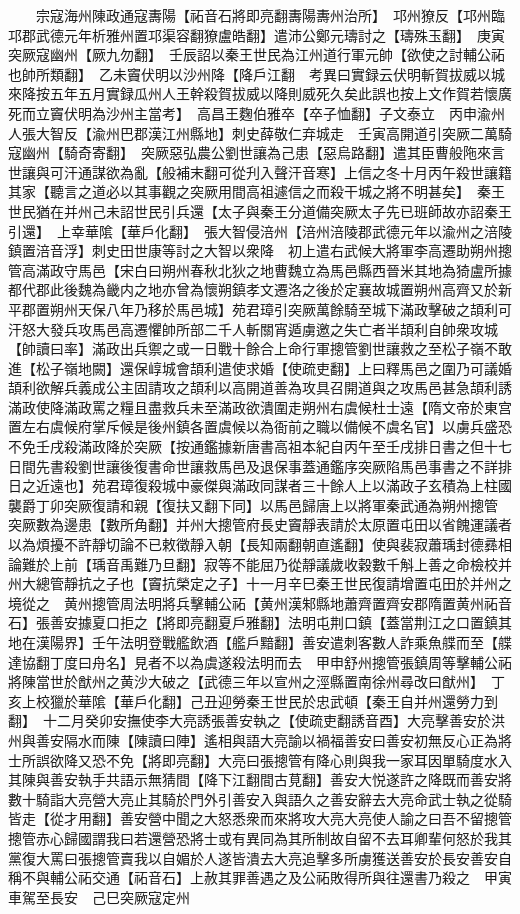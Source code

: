 　　宗寇海州陳政通寇夀陽【祏音石將即亮翻夀陽夀州治所】　邛州獠反【邛州臨邛郡武德元年析雅州置邛渠容翻獠盧皓翻】遣沛公鄭元璹討之【璹殊玉翻】　庚寅突厥寇幽州【厥九勿翻】　壬辰詔以秦王世民為江州道行軍元帥【欲使之討輔公祏也帥所類翻】　乙未竇伏明以沙州降【降戶江翻　考異曰實録云伏明斬賀拔威以城來降按五年五月實録瓜州人王幹殺賀拔威以降則威死久矣此誤也按上文作賀若懷廣死而立竇伏明為沙州主當考】　高昌王麴伯雅卒【卒子恤翻】子文泰立　丙申渝州人張大智反【渝州巴郡漢江州縣地】刺史薛敬仁弃城走　壬寅高開道引突厥二萬騎寇幽州【騎奇寄翻】　突厥惡弘農公劉世讓為己患【惡烏路翻】遣其臣曹般陁來言世讓與可汗通謀欲為亂【般補末翻可從刋入聲汗音寒】上信之冬十月丙午殺世讓籍其家【聽言之道必以其事觀之突厥用間高祖遽信之而殺干城之將不明甚矣】　秦王世民猶在并州己未詔世民引兵還【太子與秦王分道備突厥太子先已班師故亦詔秦王引還】　上幸華隂【華戶化翻】　張大智侵涪州【涪州涪陵郡武德元年以渝州之涪陵鎮置涪音浮】刺史田世康等討之大智以衆降　初上遣右武候大將軍李高遷助朔州摠管高滿政守馬邑【宋白曰朔州春秋北狄之地曹魏立為馬邑縣西晉米其地為猗盧所據都代郡此後魏為畿内之地亦曾為懷朔鎮孝文遷洛之後於定襄故城置朔州高齊又於新平郡置朔州天保八年乃移於馬邑城】苑君璋引突厥萬餘騎至城下滿政擊破之頡利可汗怒大發兵攻馬邑高遷懼帥所部二千人斬關宵遁虜邀之失亡者半頡利自帥衆攻城【帥讀曰率】滿政出兵禦之或一日戰十餘合上命行軍摠管劉世讓救之至松子嶺不敢進【松子嶺地闕】還保崞城會頡利遣使求婚【使疏吏翻】上曰釋馬邑之圍乃可議婚頡利欲解兵義成公主固請攻之頡利以高開道善為攻具召開道與之攻馬邑甚急頡利誘滿政使降滿政罵之糧且盡救兵未至滿政欲潰圍走朔州右虞候杜士遠【隋文帝於東宫置左右虞候府掌斥候是後州鎮各置虞候以為衙前之職以備候不虞名官】以虜兵盛恐不免壬戌殺滿政降於突厥【按通鑑據新唐書高祖本紀自丙午至壬戌排日書之但十七日間先書殺劉世讓後復書命世讓救馬邑及退保事蓋通鑑序突厥陷馬邑事書之不詳排日之近遠也】苑君璋復殺城中豪傑與滿政同謀者三十餘人上以滿政子玄積為上柱國襲爵丁卯突厥復請和親【復扶又翻下同】以馬邑歸唐上以將軍秦武通為朔州摠管　突厥數為邊患【數所角翻】并州大摠管府長史竇靜表請於太原置屯田以省餽運議者以為煩擾不許靜切論不已敕徵靜入朝【長知兩翻朝直遙翻】使與裴寂蕭瑀封德彞相論難於上前【瑀音禹難乃旦翻】寂等不能屈乃從靜議歲收穀數千斛上善之命檢校并州大總管靜抗之子也【竇抗榮定之子】十一月辛巳秦王世民復請增置屯田於并州之境從之　黄州摠管周法明將兵擊輔公祏【黄州漢邾縣地蕭齊置齊安郡隋置黄州祏音石】張善安據夏口拒之【將即亮翻夏戶雅翻】法明屯荆口鎮【蓋當荆江之口置鎮其地在漢陽界】壬午法明登戰艦飲酒【艦戶黯翻】善安遣刺客數人詐乘魚艓而至【艓達協翻丁度曰舟名】見者不以為虞遂殺法明而去　甲申舒州摠管張鎮周等擊輔公祏將陳當世於猷州之黄沙大破之【武德三年以宣州之涇縣置南徐州尋改曰猷州】　丁亥上校獵於華隂【華戶化翻】己丑迎勞秦王世民於忠武頓【秦王自并州還勞力到翻】　十二月癸卯安撫使李大亮誘張善安執之【使疏吏翻誘音酉】大亮擊善安於洪州與善安隔水而陳【陳讀曰陣】遙相與語大亮諭以禍福善安曰善安初無反心正為將士所誤欲降又恐不免【將即亮翻】大亮曰張摠管有降心則與我一家耳因單騎度水入其陳與善安執手共語示無猜間【降下江翻間古莧翻】善安大悦遂許之降既而善安將數十騎詣大亮營大亮止其騎於門外引善安入與語久之善安辭去大亮命武士執之從騎皆走【從才用翻】善安營中聞之大怒悉衆而來將攻大亮大亮使人諭之曰吾不留摠管摠管赤心歸國謂我曰若還營恐將士或有異同為其所制故自留不去耳卿輩何怒於我其黨復大罵曰張摠管賣我以自媚於人遂皆潰去大亮追擊多所虜獲送善安於長安善安自稱不與輔公祏交通【祏音石】上赦其罪善遇之及公祏敗得所與往還書乃殺之　甲寅車駕至長安　己巳突厥寇定州